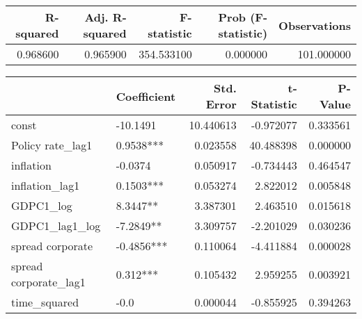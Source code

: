 \begin{tabular}{rrrrr}
\toprule
\textbf{R-squared} & \textbf{Adj. R-squared} & \textbf{F-statistic} & \textbf{Prob (F-statistic)} & \textbf{Observations} \\
\midrule
0.968600 & 0.965900 & 354.533100 & 0.000000 & 101.000000 \\
\bottomrule
\end{tabular}

\begin{tabular}{llrrr}
\toprule
 & \textbf{Coefficient} & \textbf{Std. Error} & \textbf{t-Statistic} & \textbf{P-Value} \\
\midrule
const & -10.1491 & 10.440613 & -0.972077 & 0.333561 \\
Policy rate_lag1 & 0.9538*** & 0.023558 & 40.488398 & 0.000000 \\
inflation & -0.0374 & 0.050917 & -0.734443 & 0.464547 \\
inflation_lag1 & 0.1503*** & 0.053274 & 2.822012 & 0.005848 \\
GDPC1_log & 8.3447** & 3.387301 & 2.463510 & 0.015618 \\
GDPC1_lag1_log & -7.2849** & 3.309757 & -2.201029 & 0.030236 \\
spread corporate & -0.4856*** & 0.110064 & -4.411884 & 0.000028 \\
spread corporate_lag1 & 0.312*** & 0.105432 & 2.959255 & 0.003921 \\
time_squared & -0.0 & 0.000044 & -0.855925 & 0.394263 \\
\bottomrule
\end{tabular}
